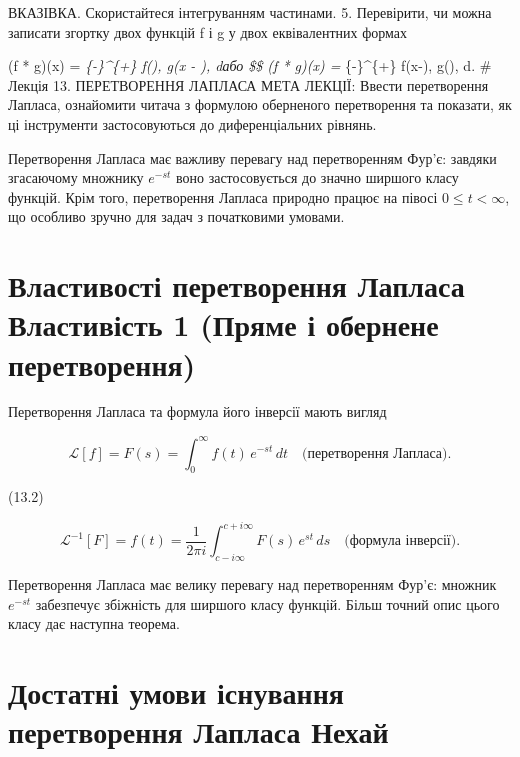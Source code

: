 \documentclass[
  ukrainian,
]{article}
\begin{document}
ВКАЗІВКА. Скористайтеся інтегруванням частинами. 5. Перевірити, чи можна
записати згортку двох функцій f і g у двох еквівалентних формах

(f * g)(x) =  \int\emph{\{-\infty\}\^{}\{+\infty\}
f(\xi), g(x - \xi), d\xi або \$\$ (f * g)(x) = 
\int}\{-\infty\}\^{}\{+\infty\} f(x-\xi), g(\xi), d\xi. \# Лекція 13.
ПЕРЕТВОРЕННЯ ЛАПЛАСА МЕТА ЛЕКЦІЇ: Ввести перетворення Лапласа,
ознайомити читача з формулою оберненого перетворення та показати, як ці
інструменти застосовуються до диференціальних рівнянь.

Перетворення Лапласа має важливу перевагу над перетворенням Фур'є:
завдяки згасаючому множнику \(e^{-st}\) воно застосовується до значно
ширшого класу функцій. Крім того, перетворення Лапласа природно працює
на півосі \(0 \le t < \infty\), що особливо зручно для задач з
початковими умовами.

\section{Властивості перетворення Лапласа Властивість 1 (Пряме і
обернене
перетворення)}\label{ux432ux43bux430ux441ux442ux438ux432ux43eux441ux442ux456-ux43fux435ux440ux435ux442ux432ux43eux440ux435ux43dux43dux44f-ux43bux430ux43fux43bux430ux441ux430-ux432ux43bux430ux441ux442ux438ux432ux456ux441ux442ux44c-1-ux43fux440ux44fux43cux435-ux456-ux43eux431ux435ux440ux43dux435ux43dux435-ux43fux435ux440ux435ux442ux432ux43eux440ux435ux43dux43dux44f}

Перетворення Лапласа та формула його інверсії мають вигляд

\[
\mathscr{L}[f] = F(s) = \int_{0}^{\infty} f(t) \, e^{-st} \, dt
\quad \text{(перетворення Лапласа).}
\]

(13.2)

\[
\mathscr{L}^{-1}[F] = f(t) = \frac{1}{2\pi i} \int_{c-i\infty}^{c+i\infty} F(s) \, e^{st} \, ds
\quad \text{(формула інверсії).}
\]

Перетворення Лапласа має велику перевагу над перетворенням Фур'є:
множник \(e^{-st}\) забезпечує збіжність для ширшого класу функцій.
Більш точний опис цього класу дає наступна теорема.

\section{Достатні умови існування перетворення Лапласа
Нехай}\label{ux434ux43eux441ux442ux430ux442ux43dux456-ux443ux43cux43eux432ux438-ux456ux441ux43dux443ux432ux430ux43dux43dux44f-ux43fux435ux440ux435ux442ux432ux43eux440ux435ux43dux43dux44f-ux43bux430ux43fux43bux430ux441ux430-ux43dux435ux445ux430ux439}
\end{document}
